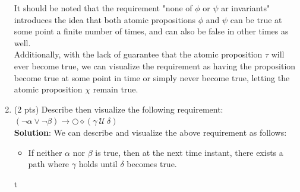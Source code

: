 \documentclass[12pt]{article}
\begin{document}
\begin{spacing}{1.5}
\begin{enumerate}
		      It should be noted that the requirement "none of $\phi$ or $\psi$ ar invariants" introduces the idea that both atomic propositions $\phi$ and $\psi$ can be true at some point a finite number of times, and can also be false in other times as well.\\
		      		      		      		      		              
		      Additionally, with the lack of guarantee that the atomic proposition $\tau$ will ever become true, we can visualize the requirement as having the proposition become true at some point in time or simply never become true, letting the atomic proposition $\chi$ remain true.
		      		      		      		      		      
		\item (2 pts) Describe then visualize the following requirement: $(\neg \alpha \lor \neg \beta) \rightarrow \bigcirc \diamond (\gamma \: \mathcal{U} \: \delta)$\\
		      		      		      		      		      
		      \textbf{Solution}: We can describe and visualize the above requirement as follows:
		      		      		      		      		      
		      		      		      		      		              
		      \begin{itemize}
		      	\item If neither $\alpha$ nor $\beta$ is true, then at the next time instant, there exists a path where $\gamma$ holds until $\delta$ becomes true.
		      \end{itemize}
		      		      		      		      		      
		      \begin{center}
		      	t
		      			      			      			      			      	

\end{center}
\end{enumerate}
\end{spacing}
\end{document}
